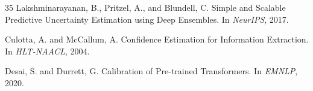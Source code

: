 \documentclass[11pt,a4paper]{article}
\begin{document}
\begin{thebibliography}{35}
Lakshminarayanan, B., Pritzel, A., and Blundell, C.
\newblock Simple and Scalable Predictive Uncertainty Estimation using Deep Ensembles.
\newblock In \emph{NeurIPS}, 2017.

Culotta, A. and McCallum, A.
\newblock Confidence Estimation for Information Extraction.
\newblock In \emph{HLT-NAACL}, 2004.

Desai, S. and Durrett, G.
\newblock Calibration of Pre-trained Transformers.
\newblock In \emph{EMNLP}, 2020.

\end{thebibliography}
\end{document}
